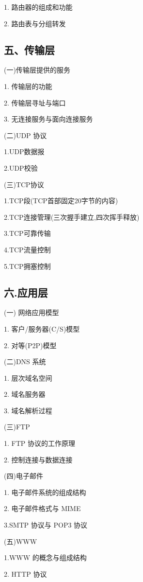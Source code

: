 \documentclass[10pt]{article}
\begin{document}
1. 路由器的组成和功能

2. 路由表与分组转发

\subsection*{五、传输层}

(一)传输层提供的服务

1. 传输层的功能

2. {\color{red}传输层寻址与端口}

3. 无连接服务与面向连接服务

(二)UDP 协议

1.UDP数据报

2.{\color{red}UDP校验}

(三)TCP协议

1.TCP段(TCP首部固定20字节的内容)

2.TCP连接管理(三次握手建立,四次挥手释放)

3.TCP可靠传输

4.TCP流量控制

5.TCP拥塞控制

\subsection*{六.应用层}

{\color{red} (一) 网络应用模型

1. 客户/服务器(C/S)模型

2. 对等(P2P)模型

(二)DNS 系统

1. 层次域名空间

2. 域名服务器

3. 域名解析过程

(三)FTP

1. FTP 协议的工作原理

2. 控制连接与数据连接

(四)电子邮件

1. 电子邮件系统的组成结构

2. 电子邮件格式与 MIME

3.SMTP 协议与 POP3 协议

(五)WWW

1.WWW 的概念与组成结构

2. HTTP 协议}
\end{document}
